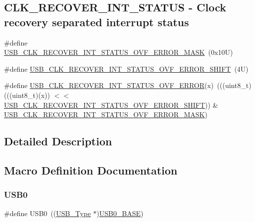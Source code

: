 \subsection*{C\+L\+K\+\_\+\+R\+E\+C\+O\+V\+E\+R\+\_\+\+I\+N\+T\+\_\+\+S\+T\+A\+T\+US -\/ Clock recovery separated interrupt status}
\begin{DoxyCompactItemize}
\item 
\#define \mbox{\hyperlink{group___u_s_b___register___masks_ga159e6afded3ea1fd5360f35010beef77}{U\+S\+B\+\_\+\+C\+L\+K\+\_\+\+R\+E\+C\+O\+V\+E\+R\+\_\+\+I\+N\+T\+\_\+\+S\+T\+A\+T\+U\+S\+\_\+\+O\+V\+F\+\_\+\+E\+R\+R\+O\+R\+\_\+\+M\+A\+SK}}~(0x10\+U)
\item 
\#define \mbox{\hyperlink{group___u_s_b___register___masks_gad67bead4d081f4a50deb6bc8e024ffc7}{U\+S\+B\+\_\+\+C\+L\+K\+\_\+\+R\+E\+C\+O\+V\+E\+R\+\_\+\+I\+N\+T\+\_\+\+S\+T\+A\+T\+U\+S\+\_\+\+O\+V\+F\+\_\+\+E\+R\+R\+O\+R\+\_\+\+S\+H\+I\+FT}}~(4\+U)
\item 
\#define \mbox{\hyperlink{group___u_s_b___register___masks_ga24f0317159c6d0686ee348c7579fbadf}{U\+S\+B\+\_\+\+C\+L\+K\+\_\+\+R\+E\+C\+O\+V\+E\+R\+\_\+\+I\+N\+T\+\_\+\+S\+T\+A\+T\+U\+S\+\_\+\+O\+V\+F\+\_\+\+E\+R\+R\+OR}}(x)~(((uint8\+\_\+t)(((uint8\+\_\+t)(x)) $<$$<$ \mbox{\hyperlink{group___u_s_b___register___masks_gad67bead4d081f4a50deb6bc8e024ffc7}{U\+S\+B\+\_\+\+C\+L\+K\+\_\+\+R\+E\+C\+O\+V\+E\+R\+\_\+\+I\+N\+T\+\_\+\+S\+T\+A\+T\+U\+S\+\_\+\+O\+V\+F\+\_\+\+E\+R\+R\+O\+R\+\_\+\+S\+H\+I\+FT}})) \& \mbox{\hyperlink{group___u_s_b___register___masks_ga159e6afded3ea1fd5360f35010beef77}{U\+S\+B\+\_\+\+C\+L\+K\+\_\+\+R\+E\+C\+O\+V\+E\+R\+\_\+\+I\+N\+T\+\_\+\+S\+T\+A\+T\+U\+S\+\_\+\+O\+V\+F\+\_\+\+E\+R\+R\+O\+R\+\_\+\+M\+A\+SK}})
\end{DoxyCompactItemize}


\subsection{Detailed Description}


\subsection{Macro Definition Documentation}
\mbox{\label{group___u_s_b___register___masks_gaea56c015ce8ad0cc88464060fde6d87c}} 
\subsubsection{\texorpdfstring{U\+S\+B0}{USB0}}
{\footnotesize\ttfamily \#define U\+S\+B0~((\mbox{\hyperlink{struct_u_s_b___type}{U\+S\+B\+\_\+\+Type}} $\ast$)\mbox{\hyperlink{group___u_s_b___register___masks_gaa47acf4992407a85e79d911ca1055d17}{U\+S\+B0\+\_\+\+B\+A\+SE}})}

